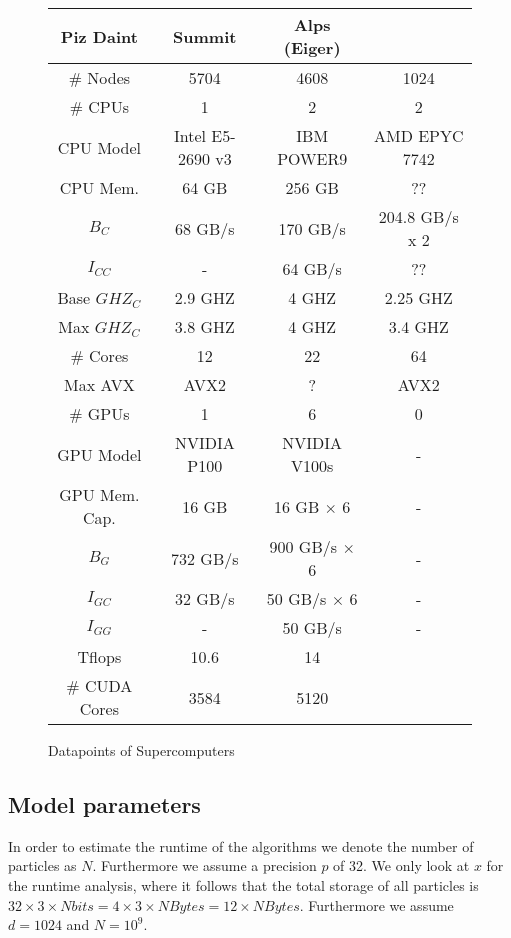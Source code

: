 \documentclass[]{article}
\begin{document}
\small
\begin{figure}[H]
	\begin{center}
		\begin{tabular}{|@{} c | c | c | c | }
			Piz Daint \cite{piz_daint} & Summit\cite{summit} & Alps (Eiger) \\ 
			\hline
			\# Nodes & 5704 & 4608 & 1024\\
			\# CPUs & 1 & 2 & 2\\
			CPU Model & Intel E5-2690 v3 \cite{E5-2690} & IBM POWER9 & AMD EPYC 7742\cite{AMDEPYC} \\
			CPU Mem. & 64 GB & 256 GB & ?? \\   
			$B_C$  & 68 GB/s & 170 GB/s & 204.8 GB/s x 2	\\
			$I_{CC}$ & - & 64 GB/s & ?? \\
			Base $GHZ_C$ & 2.9 GHZ & 4 GHZ & 2.25 GHZ\\
			Max $GHZ_C$ & 3.8 GHZ & 4 GHZ & 3.4 GHZ\\
			\# Cores & 12 & 22 & 64 \\
			Max AVX & AVX2 & ? & AVX2 \\ 
			\# GPUs & 1 & 6 & 0 \\
			GPU Model & NVIDIA P100 \cite{TESLAP100} & NVIDIA V100s \cite{NVIDIAV100} & - \\
			GPU Mem. Cap. & 16 GB & 16 GB $\times$ 6 & -\\
			$B_G$ & 732 GB/s & 900 GB/s $\times$ 6 & -\\
			$I_{GC}$ & 32 GB/s & 50 GB/s $\times$ 6 & -\\
			$I_{GG}$ & - & 50 GB/s & -\\
			Tflops & 10.6 & 14 &\\
			\# CUDA Cores & 3584 & 5120 & \\
		\end{tabular}
	\end{center}
	\caption{Datapoints of Supercomputers}
	\label{fig:datapoints}
\end{figure}


\subsection{Model parameters}

In order to estimate the runtime of the algorithms we denote the number of particles as $N$. Furthermore we assume a precision $p$ of 32. We only look at $x$ for the runtime analysis, where it follows that the total storage of all particles is $32 \times 3 \times N bits = 4 \times 3 \times N Bytes = 12 \times N Bytes$. Furthermore we assume $d = 1024$ and $N=10^9$.
\end{document}
